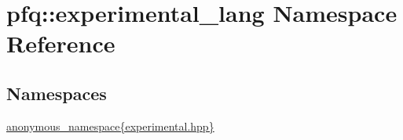 \hypertarget{namespacepfq_1_1experimental__lang}{\section{pfq\+:\+:experimental\+\_\+lang Namespace Reference}
\label{namespacepfq_1_1experimental__lang}
}
\subsection*{Namespaces}
\begin{DoxyCompactItemize}
\item 
 \hyperlink{namespacepfq_1_1experimental__lang_1_1anonymous__namespace_02experimental_8hpp_03}{anonymous\+\_\+namespace\{experimental.\+hpp\}}
\end{DoxyCompactItemize}

